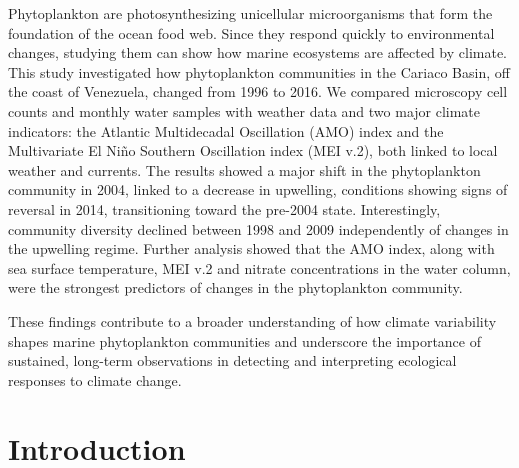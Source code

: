 \documentclass[]{agujournal2019}
\begin{document}
Phytoplankton are photosynthesizing unicellular microorganisms that form the foundation of the ocean food web. Since they respond quickly to environmental changes, studying them can show how marine ecosystems are affected by climate.
This study investigated how phytoplankton communities in the Cariaco Basin, off the coast of Venezuela, changed from 1996 to 2016. We compared microscopy cell counts and monthly water samples with weather data and two major climate indicators: the Atlantic Multidecadal Oscillation (AMO) index and the Multivariate El Niño Southern Oscillation index (MEI v.2), both linked to local weather and currents.
The results showed a major shift in the phytoplankton community in 2004, linked to a decrease in upwelling, conditions showing signs of reversal in 2014, transitioning toward the pre-2004 state. Interestingly, community diversity declined between 1998 and 2009 independently of changes in the upwelling regime. Further analysis showed that the AMO index, along with sea surface temperature, MEI v.2 and nitrate concentrations in the water column, were the strongest predictors of changes in the phytoplankton community.

These findings contribute to a broader understanding of how climate variability shapes marine phytoplankton communities and underscore the importance of sustained, long-term observations in detecting and interpreting ecological responses to climate change.









\section{Introduction}
%

\end{document}
